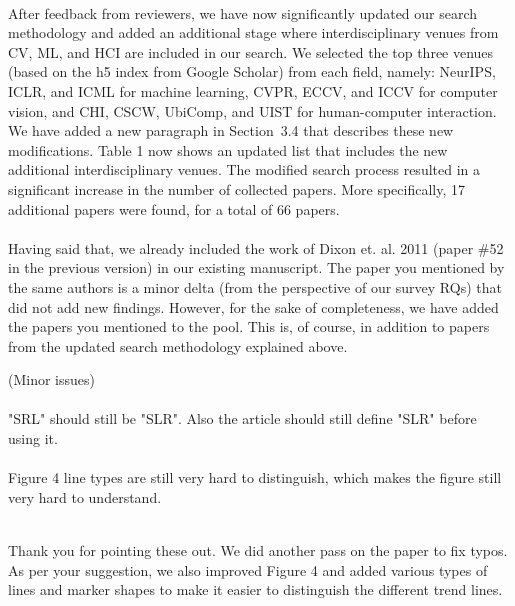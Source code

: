 \documentclass[12pt]{article}
\newcommand\response[1]{\textcolor{responseColor}{\\#1\\}}
\begin{document}
\response{
	After feedback from reviewers, we have now 
	significantly updated our search methodology and 
	added an additional stage where interdisciplinary 
	venues from CV, ML, and HCI are included in our 
	search. We selected the top three venues (based on 
	the h5 index from Google Scholar) from each field, namely: NeurIPS, 
	ICLR, and ICML for machine learning, CVPR, ECCV, and 
	ICCV for computer vision, and CHI, CSCW, UbiComp, 
	and UIST for human-computer interaction.
	We have added a new paragraph in Section~3.4 that 
	describes these new modifications. Table 1 now shows 
	an updated list that includes the new additional 
	interdisciplinary venues. The modified search 
	process resulted in a significant increase in the 
	number of collected papers. More specifically, 17 
	additional papers were found, for a total of 66 
	papers. 
\\ \\ 
	Having said that, we already included the work of 
	Dixon et. al. 2011 (paper \#52 in the previous 
	version) in our existing manuscript. 
	The paper you mentioned by the same authors is a 
	minor delta (from the perspective of our survey RQs) 
	that did not add new findings. However, for the sake 
	of completeness, we have added the papers you 
	mentioned to the pool. 
	This is, of course, in addition to papers 
	from the updated search methodology explained 
	above.  
}







(Minor issues)
\\ \\
"SRL" should still be "SLR". Also the article should still define "SLR" before using it.
\\ \\
Figure 4 line types are still very hard to distinguish, which makes the figure still very hard to understand.

\response{
	Thank you for pointing these out. We did another 
	pass on the paper to fix typos. As per your 
	suggestion, we also improved Figure 4 and added 
	various types of lines and marker shapes 
	to make it easier to 
	distinguish the different trend lines.
}
\end{document}
